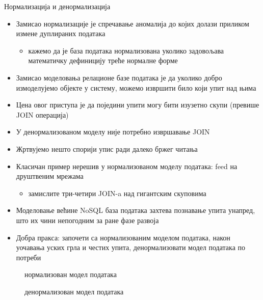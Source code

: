 \documentclass[aspectratio=169]{beamer}
\begin{document}
    \begin{frame}[allowframebreaks]{Нормализација и денормализација}
        \begin{itemize}
            \item Замисао нормализације је спречавање аномалија до којих долази приликом измене дуплираних података
            \begin{itemize}
                \item кажемо да је база података нормализована уколико задовољава математичку дефиницију треће нормалне форме
            \end{itemize} 
            \item Замисао моделовања релационе базе података је да уколико добро измоделујемо објекте у систему, можемо извршити било који упит над њима
            \item Цена овог приступа је да поједини упити могу бити изузетно скупи (превише JOIN операција)
            \item У денормализованом моделу није потребно извршавање JOIN
        \end{itemize}
        
        \framebreak
        
        \begin{itemize}
            \item Жртвујемо нешто спорији упис ради далеко бржег читања
            \item Класичан пример нерешив у нормализованом моделу података: feed на друштвеним мрежама
            \begin{itemize}
                \item замислите три-четири JOIN-a над гигантским скуповима
            \end{itemize}
            \item Моделовање већине NoSQL база података захтева познавање упита унапред, што их чини непогодним за ране фазе развоја
            \item Добра пракса: започети са нормализованим моделом података, након уочавања уских грла и честих упита, денормализовати модел података по потреби
        \end{itemize}
        
        \framebreak
        
        \begin{figure}
            \centering
            \caption{нормализован модел података}
            \label{fig:normalized_model}
        \end{figure}
        
        \framebreak
        
        \begin{figure}
            \centering
            \caption{денормализован модел података}
            \label{fig:denormalized_model}
        \end{figure}
    \end{frame}
    
\end{document}
